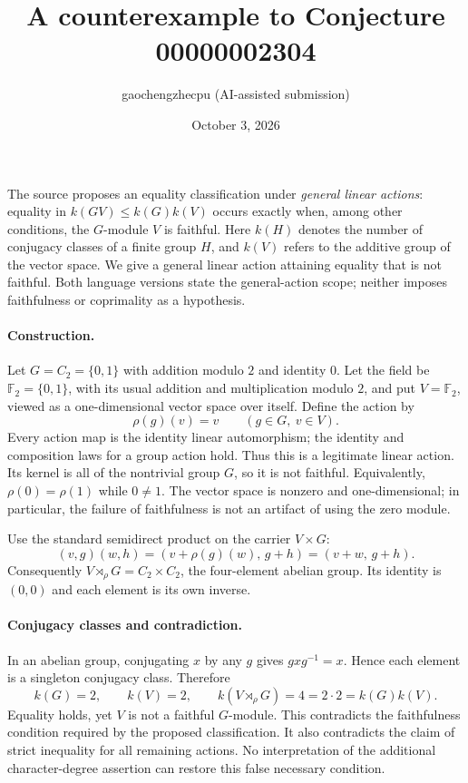 \documentclass[11pt]{article}
\title{A counterexample to Conjecture 00000002304}
\author{gaochengzhecpu (AI-assisted submission)}
\date{October 3, 2026}
\begin{document}
\maketitle

The source proposes an equality classification under \emph{general
linear actions}: equality in $k(GV)\leq k(G)k(V)$ occurs exactly when,
among other conditions, the $G$-module $V$ is faithful.
Here $k(H)$ denotes the number of conjugacy classes of a finite group
$H$, and $k(V)$ refers to the additive group of the vector space.
We give a general linear action attaining equality that is not faithful.
Both language versions state the general-action scope; neither imposes
faithfulness or coprimality as a hypothesis.

\paragraph{Construction.}
Let $G=C_2=\{0,1\}$ with addition modulo $2$ and identity $0$.
Let the field be $\mathbb F_2=\{0,1\}$, with its usual addition and
multiplication modulo $2$, and put $V=\mathbb F_2$, viewed as a
one-dimensional vector space over itself.
Define the action by
\[
 \rho(g)(v)=v\qquad(g\in G,\ v\in V).
\]
Every action map is the identity linear automorphism; the identity and
composition laws for a group action hold. Thus this is a legitimate
linear action. Its kernel is all of the nontrivial group $G$, so it is
not faithful. Equivalently, $\rho(0)=\rho(1)$ while $0\ne1$.
The vector space is nonzero and one-dimensional; in particular, the
failure of faithfulness is not an artifact of using the zero module.

Use the standard semidirect product on the carrier $V\times G$:
\[
 (v,g)(w,h)=(v+\rho(g)(w),\,g+h)=(v+w,\,g+h).
\]
Consequently $V\rtimes_\rho G=C_2\times C_2$, the four-element
abelian group. Its identity is $(0,0)$ and each element is its own
inverse.

\paragraph{Conjugacy classes and contradiction.}
In an abelian group, conjugating $x$ by any $g$ gives
$gxg^{-1}=x$. Hence each element is a singleton conjugacy class.
Therefore
\[
 k(G)=2,\qquad k(V)=2,\qquad k(V\rtimes_\rho G)=4=2\cdot2=k(G)k(V).
\]
Equality holds, yet $V$ is not a faithful $G$-module. This contradicts
the faithfulness condition required by the proposed classification.
It also contradicts the claim of strict inequality for all remaining
actions. No interpretation of the additional character-degree
assertion can restore this false necessary condition.
\end{document}

